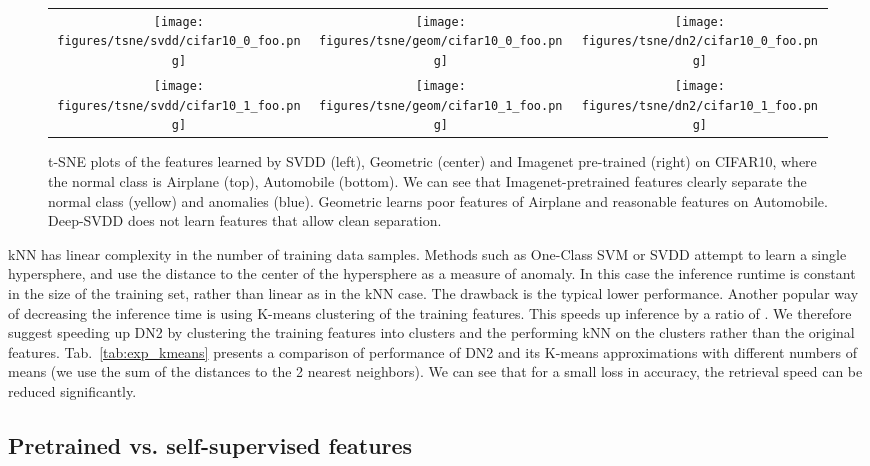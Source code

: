\documentclass{article}
\begin{document}
\begin{figure*}[ht]
  \centering
  
  

    \begin{tabular}{ccc}

   \texttt{[image: figures/tsne/svdd/cifar10\_0\_foo.png]} &
   \texttt{[image: figures/tsne/geom/cifar10\_0\_foo.png]} &
   \texttt{[image: figures/tsne/dn2/cifar10\_0\_foo.png]} \\
   \texttt{[image: figures/tsne/svdd/cifar10\_1\_foo.png]} &
   \texttt{[image: figures/tsne/geom/cifar10\_1\_foo.png]} &
   \texttt{[image: figures/tsne/dn2/cifar10\_1\_foo.png]} \\
    \end{tabular}
    \caption{t-SNE plots of the features learned by SVDD (left), Geometric (center) and Imagenet pre-trained (right) on CIFAR10, where the normal class is Airplane (top), Automobile (bottom). We can see that Imagenet-pretrained features clearly separate the normal class (yellow) and anomalies (blue). Geometric learns poor features of Airplane and reasonable features on Automobile. Deep-SVDD does not learn features that allow clean separation.  }
    \label{fig:tsne}
\end{figure*}

kNN has linear complexity in the number of training data samples. Methods such as One-Class SVM or SVDD attempt to learn a single hypersphere, and use the distance to the center of the hypersphere as a measure of anomaly. In this case the inference runtime is constant in the size of the training set, rather than linear as in the kNN case. The drawback is the typical lower performance. Another popular way \cite{fukunaga1975branch} of decreasing the inference time is using K-means clustering of the training features. This speeds up inference by a ratio of . We therefore suggest speeding up DN2 by clustering the training features into  clusters and the performing kNN on the clusters rather than the original features. Tab.~\ref{tab:exp_kmeans} presents a comparison of performance of DN2 and its K-means approximations with different numbers of means (we use the sum of the distances to the 2 nearest neighbors). We can see that for a small loss in accuracy, the retrieval speed can be reduced significantly. 

\subsection{Pretrained vs. self-supervised features}
\label{subsec:analysis:features}
\end{document}
